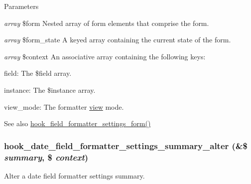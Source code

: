 \begin{DoxyParams}{Parameters}
\item[{\em array}]\$form Nested array of form elements that comprise the form. \item[{\em array}]\$form\_\-state A keyed array containing the current state of the form. \item[{\em array}]\$context An associative array containing the following keys:
\begin{DoxyItemize}
\item field: The \$field array.
\item instance: The \$instance array.
\item view\_\-mode: The formatter \hyperlink{classview}{view} mode.
\end{DoxyItemize}\end{DoxyParams}
\begin{DoxySeeAlso}{See also}
\hyperlink{group__field__types_gaf9b6aefe0b4fe6c03ebd5bd9bd1b891b}{hook\_\-field\_\-formatter\_\-settings\_\-form()} 
\end{DoxySeeAlso}
\hypertarget{date_8api_8php_a8448df9f491a337e9da8ec9157934107}{
\subsubsection[{hook\_\-date\_\-field\_\-formatter\_\-settings\_\-summary\_\-alter}]{\setlength{\rightskip}{0pt plus 5cm}hook\_\-date\_\-field\_\-formatter\_\-settings\_\-summary\_\-alter (\&\$ {\em summary}, \/  \$ {\em context})}}
\label{date_8api_8php_a8448df9f491a337e9da8ec9157934107}
Alter a date field formatter settings summary.


